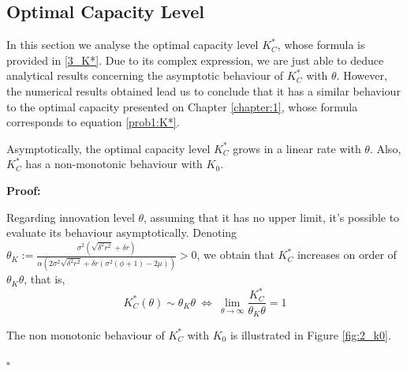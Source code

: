 \subsection{Optimal Capacity Level}

In this section we analyse the optimal capacity level $K^*_C$, whose formula is provided in \eqref{3_K*}. Due to its complex expression, we are just able to deduce analytical results concerning the asymptotic behaviour of $K^*_C$ with $\theta$. However, the numerical results obtained lead us to conclude that it has a similar behaviour to the optimal capacity presented on Chapter \ref{chapter:1}, whose formula corresponds to equation \eqref{prob1:K*}.

\begin{prop}
Asymptotically, the optimal capacity level $K^*_C$ grows in a linear rate with $\theta$. Also, $K^*_C$ has a non-monotonic behaviour with $K_0$. 
\end{prop}

\textbf{Proof:}

Regarding innovation level $\theta$, assuming that it has no upper limit, it's possible to evaluate its behaviour asymptotically. Denoting $\theta_K:=\frac{\sigma ^2 \left(\sqrt{\delta ^2 r^2}+\delta  r\right)}{\alpha  \left(2 \sigma ^2 \sqrt{\delta ^2 r^2}+\delta  r \left(\sigma ^2 (\phi +1)-2 \mu \right)\right)}>0$, we obtain that $K^*_C$ increases on order of $\theta_K \theta$, that is,
$$K^*_C(\theta) \sim \theta_K \theta \ \Leftrightarrow \ \lim_{\theta \to \infty}  \frac{K^*_C}{\theta_K \theta}=1 $$


The non monotonic behaviour of $K^*_C$ with $K_0$ is illustrated in Figure \ref{fig:2_k0}.
\begin{flushright}
	$\square$
\end{flushright}
\vspace{2cm}




